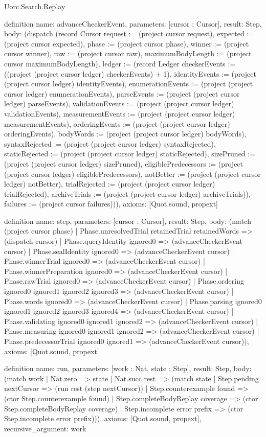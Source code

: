 \begin{lexlean}{Uorc.Search.Replay}
\begin{semanticmodule}
definition{
  name: advanceCheckerEvent,
  parameters: [cursor : Cursor],
  result: Step,
  body: (dispatch (record Cursor {request := (project cursor request), expected := (project cursor expected), phase := (project cursor phase), winner := (project cursor winner), raw := (project cursor raw), maximumBodyLength := (project cursor maximumBodyLength), ledger := (record Ledger {checkerEvents := ((project (project cursor ledger) checkerEvents) + 1), identityEvents := (project (project cursor ledger) identityEvents), enumerationEvents := (project (project cursor ledger) enumerationEvents), parseEvents := (project (project cursor ledger) parseEvents), validationEvents := (project (project cursor ledger) validationEvents), measurementEvents := (project (project cursor ledger) measurementEvents), orderingEvents := (project (project cursor ledger) orderingEvents), bodyWords := (project (project cursor ledger) bodyWords), syntaxRejected := (project (project cursor ledger) syntaxRejected), staticRejected := (project (project cursor ledger) staticRejected), sizePruned := (project (project cursor ledger) sizePruned), eligiblePredecessors := (project (project cursor ledger) eligiblePredecessors), notBetter := (project (project cursor ledger) notBetter), trialRejected := (project (project cursor ledger) trialRejected), archiveTrials := (project (project cursor ledger) archiveTrials)}), failures := (project cursor failures)})),
  axioms: [Quot.sound, propext]
}

definition{
  name: step,
  parameters: [cursor : Cursor],
  result: Step,
  body: (match (project cursor phase)
    | Phase.unresolvedTrial retainedTrial retainedWords => (dispatch cursor)
    | Phase.queryIdentity ignored0 => (advanceCheckerEvent cursor)
    | Phase.sealIdentity ignored0 => (advanceCheckerEvent cursor)
    | Phase.winnerTrial ignored0 => (advanceCheckerEvent cursor)
    | Phase.winnerPreparation ignored0 => (advanceCheckerEvent cursor)
    | Phase.rawTrial ignored0 => (advanceCheckerEvent cursor)
    | Phase.ordering ignored0 ignored1 ignored2 ignored3 => (advanceCheckerEvent cursor)
    | Phase.words ignored0 => (advanceCheckerEvent cursor)
    | Phase.parsing ignored0 ignored1 ignored2 ignored3 ignored4 => (advanceCheckerEvent cursor)
    | Phase.validating ignored0 ignored1 ignored2 => (advanceCheckerEvent cursor)
    | Phase.measuring ignored0 ignored1 ignored2 => (advanceCheckerEvent cursor)
    | Phase.predecessorTrial ignored0 ignored1 => (advanceCheckerEvent cursor)),
  axioms: [Quot.sound, propext]
}

definition{
  name: run,
  parameters: [work : Nat, state : Step],
  result: Step,
  body: (match work
    | Nat.zero => state
    | Nat.succ rest => (match state
      | Step.pending nextCursor => (run rest (step nextCursor))
      | Step.counterexample found => (ctor Step.counterexample found)
      | Step.completeBodyReplay coverage => (ctor Step.completeBodyReplay coverage)
      | Step.incomplete error prefix => (ctor Step.incomplete error prefix))),
  axioms: [Quot.sound, propext],
  recursive_argument: work
}


\end{semanticmodule}
\end{lexlean}
